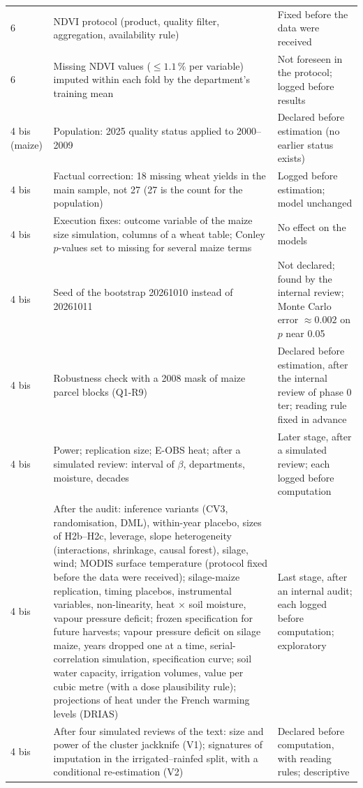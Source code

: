 {\begin{longtable}{>{\raggedright}p{1.3cm}>{\raggedright}p{7.3cm}>{\raggedright\arraybackslash}p{4.6cm}}
6 & NDVI protocol (product, quality filter, aggregation, availability rule) & Fixed before the data were received \\
6 & Missing NDVI values ($\leq 1.1\,\%$ per variable) imputed within each fold by the department's training mean & Not foreseen in the protocol; logged before results \\
4 bis (maize) & Population: 2025 quality status applied to 2000--2009 & Declared before estimation (no earlier status exists) \\
4 bis & Factual correction: 18 missing wheat yields in the main sample, not 27 (27 is the count for the population) & Logged before estimation; model unchanged \\
4 bis & Execution fixes: outcome variable of the maize size simulation, columns of a wheat table; Conley $p$-values set to missing for several maize terms & No effect on the models \\
4 bis & Seed of the bootstrap 20261010 instead of 20261011 & Not declared; found by the internal review; Monte Carlo error $\approx 0.002$ on $p$ near 0.05 \\
4 bis & Robustness check with a 2008 mask of maize parcel blocks (Q1-R9) & Declared before estimation, after the internal review of phase 0 ter; reading rule fixed in advance \\
4 bis & Power; replication size; E-OBS heat; after a simulated review: interval of $\beta$, departments, moisture, decades & Later stage, after a simulated review; each logged before computation \\
4 bis & After the audit: inference variants (CV3, randomisation, DML), within-year placebo, sizes of H2b--H2c, leverage, slope heterogeneity (interactions, shrinkage, causal forest), silage, wind; MODIS surface temperature (protocol fixed before the data were received); silage-maize replication, timing placebos, instrumental variables, non-linearity, heat $\times$ soil moisture, vapour pressure deficit; frozen specification for future harvests; vapour pressure deficit on silage maize, years dropped one at a time, serial-correlation simulation, specification curve; soil water capacity, irrigation volumes, value per cubic metre (with a dose plausibility rule); projections of heat under the French warming levels (DRIAS) & Last stage, after an internal audit; each logged before computation; exploratory \\
4 bis & After four simulated reviews of the text: size and power of the cluster jackknife (V1); signatures of imputation in the irrigated--rainfed split, with a conditional re-estimation (V2) & Declared before computation, with reading rules; descriptive \\

\end{longtable}}
